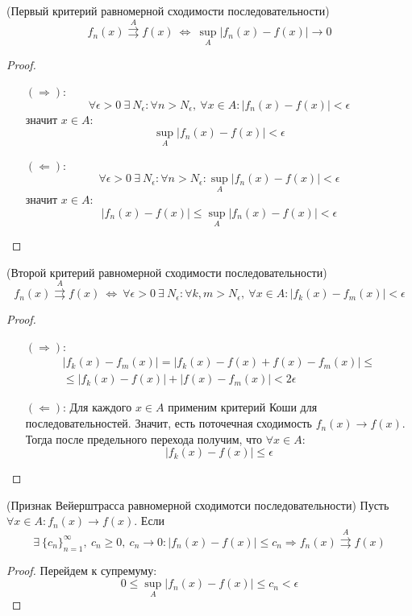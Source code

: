\begin{theorem} (Первый критерий равномерной сходимости последовательности)
    \[f_n(x) \overset{A}{\rightrightarrows} f(x)\ \Leftrightarrow\ \sup\limits_A|f_n(x)-f(x)|\to 0\]
\end{theorem}
\begin{proof}\tab
    \begin{itemize}
        \item [$(\Rightarrow)$:] 
        \[\forall \epsilon>0\ \exists\ N_{\epsilon}: \forall n>N_{\epsilon},\ \forall x\in A: |f_n(x)-f(x)|<\epsilon\]
        значит $x\in A$:
        \[\sup\limits_A|f_n(x)-f(x)|<\epsilon\]
        \item[$(\Leftarrow)$:]
        \[\forall \epsilon>0\ \exists\ N_{\epsilon}: \forall n>N_{\epsilon}: \sup\limits_A|f_n(x)-f(x)|<\epsilon\]
        значит $x\in A$:
        \[|f_n(x)-f(x)|\leq \sup\limits_A|f_n(x)-f(x)|<\epsilon\]
    \end{itemize}
\end{proof}
\begin{theorem} (Второй критерий равномерной сходимости последовательности)
    \[f_n(x)\overset{A}{\rightrightarrows} f(x)\ \Leftrightarrow\ \forall \epsilon>0\ \exists\ N_{\epsilon}: \forall k,m>N_{\epsilon},\ \forall x\in A: |f_k(x)-f_m(x)|<\epsilon\]
\end{theorem}
\begin{proof}\tab
    \begin{itemize}
        \item[$(\Rightarrow)$:] 
        \begin{multline*}
            |f_k(x)-f_m(x)|=|f_k(x)-f(x)+f(x)-f_m(x)|\leq\\
            \leq |f_k(x)-f(x)|+|f(x)-f_m(x)|<2\epsilon
        \end{multline*}
        \item[$(\Leftarrow)$:]
        Для каждого $x\in A$ применим критерий Коши для последовательностей. Значит, есть поточечная сходимость $f_n(x)\to f(x)$. Тогда после предельного перехода получим, что $\forall x\in A$:
        \[|f_k(x)-f(x)|\leq \epsilon\]
    \end{itemize}    
\end{proof}
\begin{theorem} (Признак Вейерштрасса равномерной сходимотси последовательности)
    Пусть $\forall x\in A: f_n(x)\to f(x)$. Если 
    \[\exists\ \{c_n\}_{n=1}^{\infty},\ c_n\geq 0,\ c_n\to 0: |f_n(x)-f(x)|\leq c_n \Rightarrow f_n(x)\overset{A}{\rightrightarrows} f(x)\]
\end{theorem}
\begin{proof} Перейдем к супремуму:
    \[0\leq \sup\limits_A|f_n(x)-f(x)|\leq c_n<\epsilon\]
\end{proof}